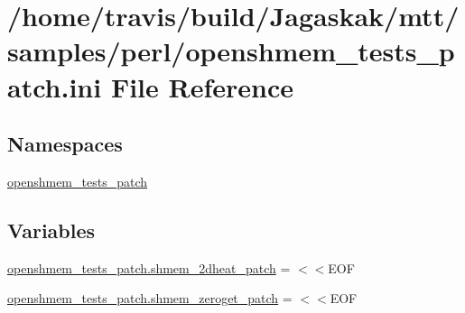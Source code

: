 \hypertarget{openshmem__tests__patch_8ini}{\section{/home/travis/build/\-Jagaskak/mtt/samples/perl/openshmem\-\_\-tests\-\_\-patch.ini File Reference}
\label{openshmem__tests__patch_8ini}
}
\subsection*{Namespaces}
\begin{DoxyCompactItemize}
\item 
\hyperlink{namespaceopenshmem__tests__patch}{openshmem\-\_\-tests\-\_\-patch}
\end{DoxyCompactItemize}
\subsection*{Variables}
\begin{DoxyCompactItemize}
\item 
\hyperlink{namespaceopenshmem__tests__patch_a391991e1010e023b4787fba54765e3b1}{openshmem\-\_\-tests\-\_\-patch.\-shmem\-\_\-2dheat\-\_\-patch} = $<$$<$E\-O\-F
\item 
\hyperlink{namespaceopenshmem__tests__patch_a3aaaf9e5a26acd1ddc1ed38bee8c1366}{openshmem\-\_\-tests\-\_\-patch.\-shmem\-\_\-zeroget\-\_\-patch} = $<$$<$E\-O\-F
\end{DoxyCompactItemize}
